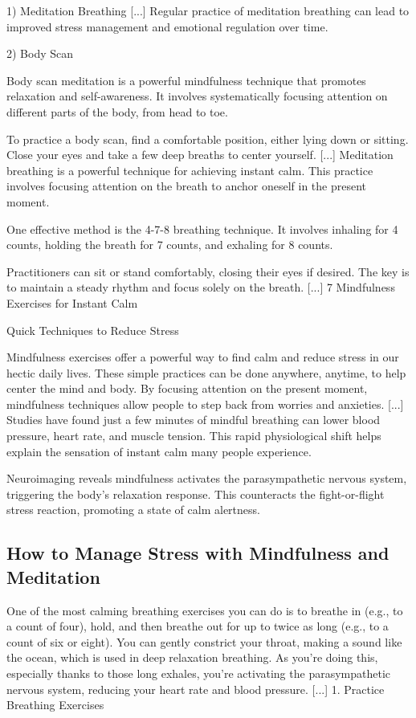 \documentclass[12pt]{article}
\begin{document}
1) Meditation Breathing [...] Regular practice of meditation breathing can lead to improved stress management and emotional regulation over time.

2) Body Scan

Body scan meditation is a powerful mindfulness technique that promotes relaxation and self-awareness. It involves systematically focusing attention on different parts of the body, from head to toe.

To practice a body scan, find a comfortable position, either lying down or sitting. Close your eyes and take a few deep breaths to center yourself. [...] Meditation breathing is a powerful technique for achieving instant calm. This practice involves focusing attention on the breath to anchor oneself in the present moment.

One effective method is the 4-7-8 breathing technique. It involves inhaling for 4 counts, holding the breath for 7 counts, and exhaling for 8 counts.

Practitioners can sit or stand comfortably, closing their eyes if desired. The key is to maintain a steady rhythm and focus solely on the breath. [...] 7 Mindfulness Exercises for Instant Calm

Quick Techniques to Reduce Stress

Mindfulness exercises offer a powerful way to find calm and reduce stress in our hectic daily lives. These simple practices can be done anywhere, anytime, to help center the mind and body. By focusing attention on the present moment, mindfulness techniques allow people to step back from worries and anxieties. [...] Studies have found just a few minutes of mindful breathing can lower blood pressure, heart rate, and muscle tension. This rapid physiological shift helps explain the sensation of instant calm many people experience.

Neuroimaging reveals mindfulness activates the parasympathetic nervous system, triggering the body's relaxation response. This counteracts the fight-or-flight stress reaction, promoting a state of calm alertness.\subsection{How to Manage Stress with Mindfulness and Meditation}
One of the most calming breathing exercises you can do is to breathe in (e.g., to a count of four), hold, and then breathe out for up to twice as long (e.g., to a count of six or eight). You can gently constrict your throat, making a sound like the ocean, which is used in deep relaxation breathing. As you’re doing this, especially thanks to those long exhales, you’re activating the parasympathetic nervous system, reducing your heart rate and blood pressure. [...] 1. Practice Breathing Exercises
\end{document}
